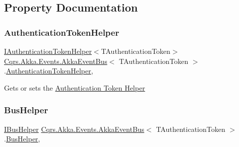 \subsection{Property Documentation}
\mbox{\label{classCqrs_1_1Akka_1_1Events_1_1AkkaEventBus_a03166dfca723430ae548e833a2262632_a03166dfca723430ae548e833a2262632}} 
\subsubsection{\texorpdfstring{Authentication\+Token\+Helper}{AuthenticationTokenHelper}}
{\footnotesize\ttfamily \hyperlink{interfaceCqrs_1_1Authentication_1_1IAuthenticationTokenHelper}{I\+Authentication\+Token\+Helper}$<$T\+Authentication\+Token$>$ \hyperlink{classCqrs_1_1Akka_1_1Events_1_1AkkaEventBus}{Cqrs.\+Akka.\+Events.\+Akka\+Event\+Bus}$<$ T\+Authentication\+Token $>$.\hyperlink{classCqrs_1_1Authentication_1_1AuthenticationTokenHelper}{Authentication\+Token\+Helper}\hspace{0.3cm}{\ttfamily [get]}, {\ttfamily [protected]}}



Gets or sets the \hyperlink{}{Authentication Token Helper} 

\mbox{\label{classCqrs_1_1Akka_1_1Events_1_1AkkaEventBus_a04311f852422c212c4dfa35e8cc21e2e_a04311f852422c212c4dfa35e8cc21e2e}} 
\subsubsection{\texorpdfstring{Bus\+Helper}{BusHelper}}
{\footnotesize\ttfamily \hyperlink{interfaceCqrs_1_1Bus_1_1IBusHelper}{I\+Bus\+Helper} \hyperlink{classCqrs_1_1Akka_1_1Events_1_1AkkaEventBus}{Cqrs.\+Akka.\+Events.\+Akka\+Event\+Bus}$<$ T\+Authentication\+Token $>$.\hyperlink{classCqrs_1_1Bus_1_1BusHelper}{Bus\+Helper}\hspace{0.3cm}{\ttfamily [get]}, {\ttfamily [protected]}}



